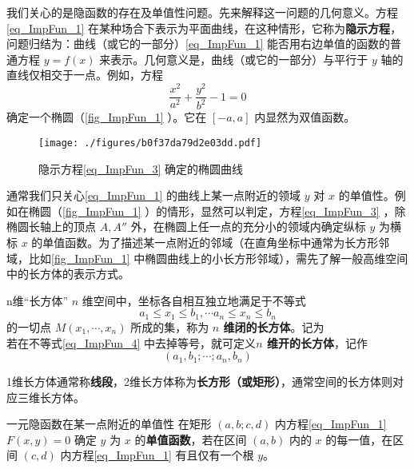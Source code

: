 我们关心的是隐函数的存在及单值性问题。先来解释这一问题的几何意义。方程\autoref{eq_ImpFun_1} 在某种场合下表示为平面曲线，在这种情形，它称为\textbf{隐示方程}，问题归结为：曲线（或它的一部分）\autoref{eq_ImpFun_1} 能否用右边单值的函数的普通方程 $y=f(x)$ 来表示。几何意义是，曲线（或它的一部分）与平行于 $y$ 轴的直线仅相交于一点。例如，方程 
\begin{equation}\label{eq_ImpFun_3}
\frac{x^2}{a^2}+\frac{y^2}{b^2}-1=0
\end{equation}
确定一个椭圆（\autoref{fig_ImpFun_1} ）。它在 $[-a,a]$ 内显然为双值函数。
\begin{figure}[ht]
\centering
\texttt{[image: ./figures/b0f37da79d2e03dd.pdf]}
\caption{隐示方程\autoref{eq_ImpFun_3} 确定的椭圆曲线} \label{fig_ImpFun_1}
\end{figure}
通常我们只关心\autoref{eq_ImpFun_1} 的曲线上某一点附近的领域 $y$ 对 $x$ 的单值性。例如在椭圆（\autoref{fig_ImpFun_1} ）的情形，显然可以判定，方程\autoref{eq_ImpFun_3} ，除椭圆长轴上的顶点 $A,A''$ 外，在椭圆上任一点的充分小的领域内确定纵标 $y$ 为横标 $x$ 的单值函数。为了描述某一点附近的邻域（在直角坐标中通常为长方形邻域，比如\autoref{fig_ImpFun_1} 中椭圆曲线上的小长方形邻域），需先了解一般高维空间中的长方体的表示方式。
\begin{definition}{n维“长方体”}\label{def_ImpFun_2}
$n$ 维空间中，坐标各自相互独立地满足于不等式
\begin{equation}\label{eq_ImpFun_4}
a_1\leq x_1\leq b_1,\cdots a_n\leq x_n\leq b_n
\end{equation}
的一切点 $M(x_1,\cdots,x_n)$ 所成的集，称为\textbf{ $n$ 维闭的长方体}。记为
\begin{equation}
[a_1,b_1;\cdots;a_n,b_n]
\end{equation}
若在不等式\autoref{eq_ImpFun_4} 中去掉等号，就可定义\textbf{$n$ 维开的长方体}，记作
\begin{equation}
(a_1,b_1;\cdots;a_n,b_n)
\end{equation}

\end{definition}
1维长方体通常称\textbf{线段}，2维长方体称为\textbf{长方形（或矩形）}，通常空间的长方体则对应三维长方体。
\begin{definition}{一元隐函数在某一点附近的单值性}\label{def_ImpFun_1}
在矩形 $(a,b;c,d)$ 内方程\autoref{eq_ImpFun_1} $F(x,y)=0$ 确定 $y$ 为 $x$ 的\textbf{单值函数}，若在区间 $(a,b)$ 内的 $x$ 的每一值，在区间 $(c,d)$ 内方程\autoref{eq_ImpFun_1} 有且仅有一个根 $y$。
\end{definition}

